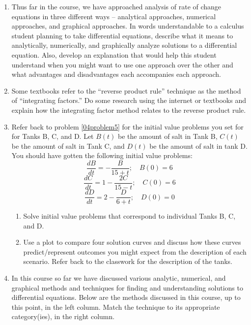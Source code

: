 \begin{enumerate}
\item	Thus far in the course, we have approached analysis of rate of change equations in three different ways -- analytical approaches, numerical approaches, and graphical approaches. In words understandable to a calculus student planning to take differential equations, describe what it means to analytically, numerically, and graphically analyze solutions to a differential equation. Also, develop an explanation that would help this student understand when you might want to use one approach over the other and what advantages and disadvantages each accompanies each approach. \label{04HWproblem7}

\item	Some textbooks refer to the ``reverse product rule'' technique as the method of ``integrating factors.'' Do some research using the internet or textbooks and explain how the integrating factor method relates to the reverse product rule. \label{04HWproblem8}

\item Refer back to problem \ref{04problem5} for the initial value problems you set for for Tanks B, C, and D. Let $B(t)$ be the amount of salt in Tank B, $C(t)$ be the amount of salt in Tank C, and $D(t)$ be the amount of salt in tank D. You should have gotten the following initial value problems:
\[
\frac{dB}{dt}=-\frac{B}{15+t}; \quad B(0)=6
\]
\[
\frac{dC}{dt}=1-\frac{2C}{15-t}; \quad C(0)=6
\]
\[
\frac{dD}{dt}=2-\frac{D}{6+t}; \quad D(0)=0
\]
\begin{enumerate}
\item Solve initial value problems that correspond to individual Tanks B, C, and D.
\item Use a plot to compare four solution curves and discuss how these curves predict/represent outcomes you might expect from the description of each scenario. Refer back to the classwork for the description of the tanks.
\end{enumerate}

\item In this course so far we have discussed various analytic, numerical, and graphical methods and techniques for finding and understanding solutions to differential equations. Below are the methods discussed in this course, up to this point, in the left column. Match the technique to its appropriate category(ies), in the right column. \label{04HWproblem10}


\end{enumerate}
